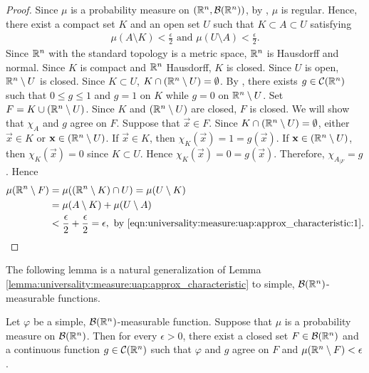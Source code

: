 \begin{proof}
Since $\mu$ is a probability measure on $({\mathbb R}^n, {\mathcal B}({\mathbb R}^n))$, by , $\mu$ is regular. Hence, there exist a compact set $K$ and an open set $U$ such that $K \subset A \subset U$ satisfying \begin{align}
    \label{eqn:universality:measure:uap:approx_characteristic:1}
    \mu(A \setminus K ) < \frac{\epsilon}{2} \text{ and } \mu (U \setminus A) < \frac{\epsilon}{2}.
\end{align}
Since ${\mathbb R}^n$ with the standard topology is a metric space, ${\mathbb R}^n$ is Hausdorff and normal. Since $K$ is compact and ${\mathbb R}^n$ Hausdorff, $K$ is closed. Since $U$ is open, ${\mathbb R}^n \setminus U$ is closed. Since $K \subset U$, $K \cap ({\mathbb R}^n \setminus U) = \emptyset$. By , there exists $g \in {\mathcal C}({\mathbb R}^n)$ such that $0 \leq g \leq 1$ and $g = 1$ on $K$ while $g = 0$ on ${\mathbb R}^n \setminus U$. Set $F = K \cup ({\mathbb R}^n \setminus U)$. Since $K$ and $ ({\mathbb R}^n \setminus U)$ are closed, $F$ is closed. We will show that $\chi_A$ and $g$ agree on $F$. Suppose that $\vec{x} \in F$. Since $K \cap ({\mathbb R}^n \setminus U) = \emptyset$, either $\vec{x} \in K$ or $\mathbf{x} \in ({\mathbb R}^n \setminus U)$. If $\vec{x} \in K$, then $\chi_{K}(\vec{x}) = 1 = g(\vec{x})$. If $\mathbf{x} \in ({\mathbb R}^n \setminus U)$,
then $\chi_{K}(\vec{x}) = 0$ since $K \subset U$. Hence $\chi_{K}(\vec{x}) = 0 = g(\vec{x})$. Therefore, $\chi_{A_{| F}} = g$. Hence \begin{align*}
        \mu ({\mathbb R}^n \setminus F) &= \mu (({\mathbb R}^n \setminus K) \cap U) = \mu (U \setminus K) \\
                               &= \mu (A \setminus K) + \mu(U \setminus A) \\
                               &< \frac{\epsilon}{2} + \frac{\epsilon}{2} = \epsilon, \text{ by \ref{eqn:universality:measure:uap:approx_characteristic:1}} . 
\end{align*}
\end{proof}
The following lemma is a natural generalization of Lemma \ref{lemma:universality:measure:uap:approx_characteristic} to simple, ${\mathcal B}({\mathbb R}^n)$-measurable functions.
\begin{lemma}
\label{lemma:universality:measure:uap:approx_simple}
Let $\varphi$ be a simple, ${\mathcal B}({\mathbb R}^n)$-measurable function. Suppose that $\mu$ is a probability measure on ${\mathcal B}({\mathbb R}^n)$. Then for every $\epsilon > 0$, there exist a closed set $F \in {\mathcal B}({\mathbb R}^n)$ and a continuous function $g \in {\mathcal C}({\mathbb R}^n)$ such that $\varphi$ and $g$ agree on $F$ and $\mu ({\mathbb R}^n \setminus F) < \epsilon$.
\end{lemma}
